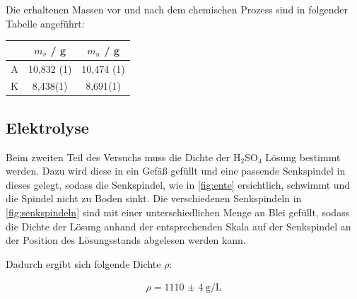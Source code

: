 \documentclass[11pt,ngerman]{scrartcl}
\begin{document}
Die erhaltenen Massen vor und nach dem chemischen Prozess sind in folgender Tabelle angeführt:

\begin{center}
	\begin{tabular}{|c|S[table-format=2.3(1)]|S[table-format=2.3(1)]|} \hline
		  & {$m_v$ / g} & {$m_n$ / g} \\ \hline
		A & 10,832	(1)   & 10,474	(1)   \\ \hline
		K & 8,438(1)    & 8,691(1)    \\ \hline
	\end{tabular}
	\label{tab:massen}
\end{center}



\subsection{Elektrolyse}

Beim zweiten Teil des Versuchs muss die Dichte der H$_2$SO$_4$ Lösung bestimmt werden. Dazu wird diese in ein Gefäß gefüllt und eine passende Senkspindel in dieses gelegt, sodass die Senkspindel, wie in \autoref{fig:ente} ersichtlich, schwimmt und die Spindel nicht zu Boden sinkt. Die verschiedenen Senkspindeln in \autoref{fig:senkspindeln} sind mit einer unterschiedlichen Menge an Blei gefüllt, sodass die Dichte der Lösung anhand der entsprechenden Skala auf der Senkspindel an der Position des Lösungsstands abgelesen werden kann.

Dadurch ergibt sich folgende Dichte $\rho$:

\begin{align*}
	\rho = \SI{1110(4)}{\g\per\L}
\end{align*}
\end{document}
